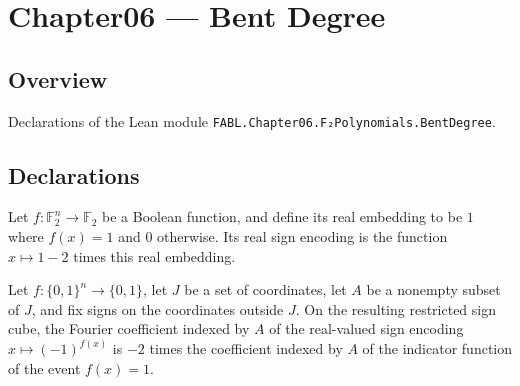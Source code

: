 \chapter{Chapter06 — Bent Degree}
\section{Overview}

Declarations of the Lean module \texttt{FABL.Chapter06.F₂Polynomials.BentDegree}.

\section{Declarations}

\begin{theorem}
\label{FABL.realSignEncodedFunction_eq_one_sub_two_booleanRealEmbedding}
\leanok
{}
Let $f:\mathbb F_2^n\to\mathbb F_2$ be a Boolean function, and define its real embedding
to be $1$ where $f(x)=1$ and $0$ otherwise. Its real sign encoding is the function
$x\mapsto 1-2$ times this real embedding.
\end{theorem}

\begin{theorem}
\label{FABL.restrictionFourierCoeff_realSignEncodedFunction_eq_neg_two_mul}
\leanok
{}
Let $f:\{0,1\}^n\to\{0,1\}$, let $J$ be a set of coordinates, let $A$ be a nonempty
subset of $J$, and fix signs on the coordinates outside $J$. On the resulting restricted
sign cube, the Fourier coefficient indexed by $A$ of the real-valued sign encoding
$x\mapsto(-1)^{f(x)}$ is $-2$ times the coefficient indexed by $A$ of the indicator
function of the event $f(x)=1$.
\end{theorem}

